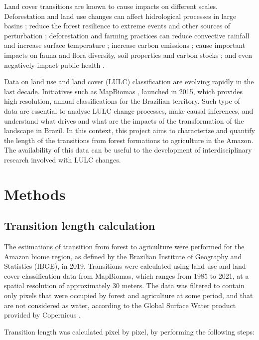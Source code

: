 \documentclass[essd, manuscript]{copernicus}
\begin{document}
Land cover transitions are known to cause impacts on different scales.
Deforestation and land use changes can affect hidrological processes in large basins \citep{Arias2018}; reduce the forest resilience to extreme events and other sources of perturbation \citep{Boulton2022}; deforestation and farming practices can reduce convective rainfall and increase surface temperature \citep{Maeda2021}; increase carbon emissions \citep{Gatti2021}; cause important impacts on fauna and flora diversity, soil properties and carbon stocks \citep{Nunes2022}; and even negatively impact public health \citep{Ellwanger2020}.

Data on land use and land cover (LULC) classification are evolving rapidly in the last decade.
Initiatives such as MapBiomas \citep{Souza2020}, launched in 2015, which provides high resolution, annual classifications for the Brazilian territory.
Such type of data are essential to analyse LULC change processes, make causal inferences, and understand what drives and what are the impacts of the transformation of the landscape in Brazil.
In this context, this project aims to characterize and quantify the length of the transitions from forest formations to agriculture in the Amazon.
The availability of this data can be useful to the development of interdisciplinary research involved with LULC changes.

\section{Methods}

\subsection{Transition length calculation}

The estimations of transition from forest to agriculture were performed for the Amazon biome region, as defined by the Brazilian Institute of Geography and Statistics (IBGE), in 2019.
Transitions were calculated using land use and land cover classification data from MapBiomas, which ranges from 1985 to 2021, at a spatial resolution of approximately 30 meters.
The data was filtered to contain only pixels that were occupied by forest and agriculture at some period, and that are not considered as water, according to the Global Surface Water product provided by Copernicus \citep{Pekel2016}.

Transition length was calculated pixel by pixel, by performing the following steps:
\end{document}

